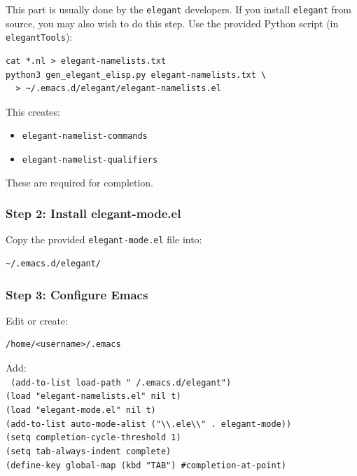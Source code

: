 This part is usually done by the {\tt elegant} developers. If you install {\tt elegant} from source,
you may also wish to do this step. Use the provided Python script (in {\tt elegantTools}):
\begin{lstlisting}
cat *.nl > elegant-namelists.txt
python3 gen_elegant_elisp.py elegant-namelists.txt \
  > ~/.emacs.d/elegant/elegant-namelists.el
\end{lstlisting}

This creates:
\begin{itemize}[noitemsep]
\item \texttt{elegant-namelist-commands}
\item \texttt{elegant-namelist-qualifiers}
\end{itemize}

These are required for completion.

\subsubsection{Step 2: Install elegant-mode.el}

Copy the provided \texttt{elegant-mode.el} file into:
\begin{lstlisting}
~/.emacs.d/elegant/
\end{lstlisting}

\subsubsection{Step 3: Configure Emacs}

Edit or create:
\begin{lstlisting}
/home/<username>/.emacs
\end{lstlisting}

\noindent
Add:\\
{\tt
(add-to-list \textquotesingle load-path "~/.emacs.d/elegant") \\
(load "elegant-namelists.el" nil t) \\
(load "elegant-mode.el" nil t)\\
(add-to-list \textquotesingle auto-mode-alist \textquotesingle ("\textbackslash\textbackslash .ele\textbackslash\textbackslash\textquotesingle " . elegant-mode)) \\
(setq completion-cycle-threshold 1) \\
(setq tab-always-indent \textquotesingle complete) \\
(define-key global-map (kbd "TAB") \#\textquotesingle completion-at-point) \\
}

